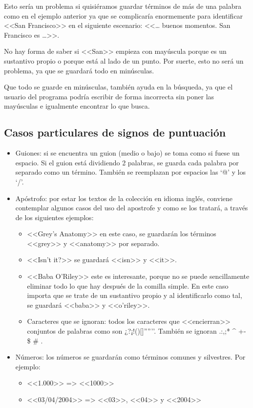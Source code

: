 Esto sería un problema si quisiéramos guardar términos de más de una palabra como en el ejemplo anterior ya que se complicaría enormemente para identificar <<San Francisco>> en el siguiente escenario: <<… buenos momentos. San Francisco es …>>.

No hay forma de saber si <<San>> empieza con mayúscula porque es un sustantivo propio o porque está al lado de un punto. Por suerte, esto no será un problema, ya que se guardará todo en minúsculas.

Que todo se guarde en minúsculas, también ayuda en la búsqueda, ya que el usuario del programa podría escribir de forma incorrecta sin poner las mayúsculas e igualmente encontrar lo que busca.

 
 
\subsection{Casos particulares de signos de puntuación}
 
\begin{itemize}

\item Guiones: si se encuentra un guion (medio o bajo) se toma como si fuese un espacio. Si el guion está dividiendo 2 palabras, se guarda cada palabra por separado como un término. También se reemplazan por espacios las ‘@’ y los ‘/’.

\item Apóstrofo: por estar los textos de la colección en idioma inglés, conviene contemplar algunos casos del uso del apostrofe y como se los tratará, a través de los siguientes ejemplos:
\begin{itemize}

\item   <<Grey’s Anatomy>> en este caso, se guardarán los términos <<grey>> y <<anatomy>> por separado.
\item   <<Isn’t it?>> se guardará <<isn>> y <<it>>.
\item   <<Baba O’Riley>> este es interesante, porque no se puede sencillamente eliminar todo lo que hay después de la comilla simple. En este caso importa que se trate de un sustantivo propio y al identificarlo como tal, se guardará <<baba>> y <<o’riley>>.
 \item  Caracteres que se ignoran: todos los caracteres que <<encierran>> conjuntos de palabras como son ¿?¡!()[]{}””’’. También se ignoran .:,;* \^{} +- \$ \# .

\end{itemize}

\item Números: los números se guardarán como términos comunes y silvestres. Por ejemplo:

\begin{itemize}
\item  <<1.000>> => <<1000>>
\item <<03/04/2004>> => <<03>>, <<04>> y <<2004>>
\end{itemize}

\end{itemize}